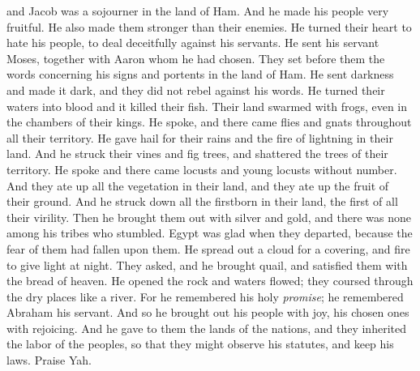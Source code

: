 \begin{biblechapter}
and Jacob was a sojourner in the land of Ham.
\verse And he made his people very fruitful. 
He also made them stronger than their enemies.
\verse He turned their heart to hate his people, 
to deal deceitfully against his servants.
\verse He sent his servant Moses, 
together with Aaron whom he had chosen.
\verse They set before them the words concerning his signs 
and portents in the land of Ham.
\verse He sent darkness and made it dark, 
and they did not rebel against his words.
\verse He turned their waters into blood 
and it killed their fish.
\verse Their land swarmed with frogs, 
even in the chambers of their kings.
\verse He spoke, and there came flies 
and gnats throughout all their territory.
\verse He gave hail for their rains 
and the fire of lightning in their land.
\verse And he struck their vines and fig trees, 
and shattered the trees of their territory.
\verse He spoke and there came locusts 
and young locusts without number.
\verse And they ate up all the vegetation in their land, 
and they ate up the fruit of their ground.
\verse And he struck down all the firstborn in their land, 
the first of all their virility.
\verse Then he brought them out with silver and gold, 
and there was none among his tribes who stumbled.
\verse Egypt was glad when they departed, 
because the fear of them had fallen upon them.
\verse He spread out a cloud for a covering, 
and fire to give light at night.
\verse They asked, and he brought quail, 
and satisfied them with the bread of heaven.
\verse He opened the rock and waters flowed; 
they coursed through the dry places like a river.
\verse For he remembered his holy \textit{promise}; 
he remembered Abraham his servant.
\verse And so he brought out his people with joy, 
his chosen ones with rejoicing.
\verse And he gave to them the lands of the nations, 
and they inherited the labor of the peoples,
\verse so that they might observe his statutes, 
and keep his laws. 
Praise Yah.
\end{biblechapter}

